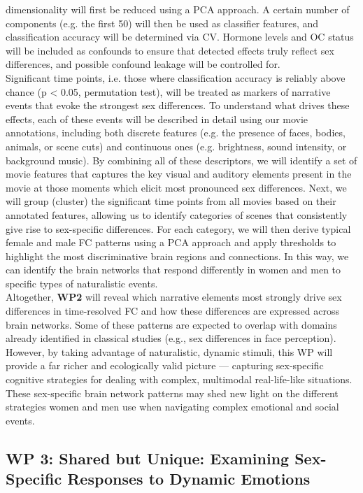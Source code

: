 \documentclass[11pt,a4paper]{article}
\begin{document}
dimensionality will first be reduced using a PCA approach. A certain number of components (e.g. the first 50) 
will then be used as classifier features, and classification accuracy will be determined via CV. Hormone levels and OC status will be
included as confounds to ensure that detected effects truly reflect 
sex differences, and possible confound leakage \parencite{hamdanConfoundleakageConfoundRemoval2022a} will be controlled for.\\
Significant time points, i.e. those where classification accuracy is reliably above chance (p < 0.05, permutation test), 
will be treated as markers of narrative events that evoke the strongest sex differences. To understand what drives these effects, 
each of these events will be described in detail using our movie annotations, including both discrete features 
(e.g. the presence of faces, bodies, animals, or scene cuts) and continuous ones (e.g. brightness, 
sound intensity, or background music). By combining all of these descriptors, we will identify a 
set of movie features that captures the key visual and auditory elements present in the movie at those moments which 
elicit most pronounced sex differences.
Next, we will group (cluster) the significant time points from all movies based on their annotated features, allowing us to 
identify categories of scenes that consistently give rise to sex-specific differences. For each category, we will then 
derive typical female and male FC patterns using a PCA approach and apply thresholds to highlight the most discriminative brain regions 
and connections. In this way, we can identify the brain networks that respond differently in women and men to specific 
types of naturalistic events.\\
Altogether, \textbf{WP2} will reveal which narrative elements most strongly drive sex differences in time-resolved FC and how 
these differences are expressed across brain networks. Some of these patterns are expected to overlap with domains already 
identified in classical studies (e.g., sex differences in face perception). However, by taking advantage of naturalistic, dynamic stimuli, 
this WP will provide a far richer and ecologically valid picture — capturing sex-specific cognitive strategies for dealing with 
complex, multimodal real-life-like situations. These sex-specific brain network patterns may shed new light on the 
different strategies women and men use when navigating complex emotional and social events.

\subsection*{WP 3: Shared but Unique: Examining Sex-Specific Responses to Dynamic Emotions}
\end{document}
